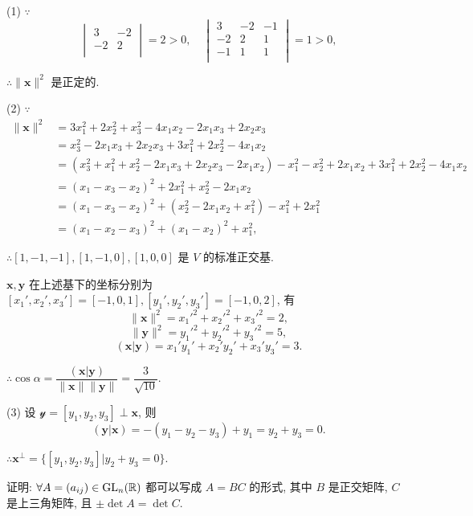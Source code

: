 \documentclass[color=black,device=normal,lang=cn,mode=geye]{elegantnote}
\begin{document}
\begin{solution}
    (1) $\because$
    \[\begin{vmatrix}
        3 & -2 \\
        -2 & 2 \\
    \end{vmatrix}=2>0,\quad\begin{vmatrix}
        3 & -2 & -1 \\
        -2 & 2 & 1 \\
        -1 & 1 & 1 \\
    \end{vmatrix}=1>0,\]

    $\therefore\|\boldsymbol{x}\|^2$ 是正定的.

    (2) $\because$
    \begin{align*}
        \|\boldsymbol{x}\|^2 & =3x_1^2+2x_2^2+x_3^2-4x_1x_2-2x_1x_3+2x_2x_3 \\
        & =x_3^2-2x_1x_3+2x_2x_3+3x_1^2+2x_2^2-4x_1x_2 \\
        & =(x_3^2+x_1^2+x_2^2-2x_1x_3+2x_2x_3-2x_1x_2)-x_1^2-x_2^2+2x_1x_2+3x_1^2+2x_2^2-4x_1x_2 \\
        & =(x_1-x_3-x_2)^2+2x_1^2+x_2^2-2x_1x_2 \\
        & =(x_1-x_3-x_2)^2+(x_2^2-2x_1x_2+x_1^2)-x_1^2+2x_1^2 \\
        & =(x_1-x_2-x_3)^2+(x_1-x_2)^2+x_1^2,
    \end{align*}

    $\therefore[1,-1,-1],[1,-1,0],[1,0,0]$ 是 $V$ 的标准正交基.
    
    $\boldsymbol{x},\boldsymbol{y}$ 在上述基下的坐标分别为 $[x_1',x_2',x_3']=[-1,0,1],[y_1',y_2',y_3']=[-1,0,2]$, 有
    \[\|\boldsymbol{x}\|^2=x_1'^2+x_2'^2+x_3'^2=2,\]
    \[\|\boldsymbol{y}\|^2=y_1'^2+y_2'^2+y_3'^2=5,\]
    \[(\boldsymbol{x}|\boldsymbol{y})=x_1'y_1'+x_2'y_2'+x_3'y_3'=3.\]

    $\therefore\cos\alpha=\dfrac{(\boldsymbol{x}|\boldsymbol{y})}{\|\boldsymbol{x}\|\|\boldsymbol{y}\|}=\dfrac{3}{\sqrt{10}}$.

    (3) 设 $\mathcal{y}=[y_1,y_2,y_3]\perp\boldsymbol{x}$, 则
    \[(\boldsymbol{y}|\boldsymbol{x})=-(y_1-y_2-y_3)+y_1=y_2+y_3=0.\]

    $\therefore\boldsymbol{x}^\perp=\{[y_1,y_2,y_3]|y_2+y_3=0\}$.
\end{solution}
\begin{exercise}\label{ex1.3}
    证明: $\forall A=(a_{ij})\in\operatorname{GL} _n(\mathbb{R})$ 都可以写成 $A=BC$ 的形式, 其中 $B$ 是正交矩阵, $C$ 是上三角矩阵, 且 $\pm\det A=\det C$.
\end{exercise}
\end{document}
